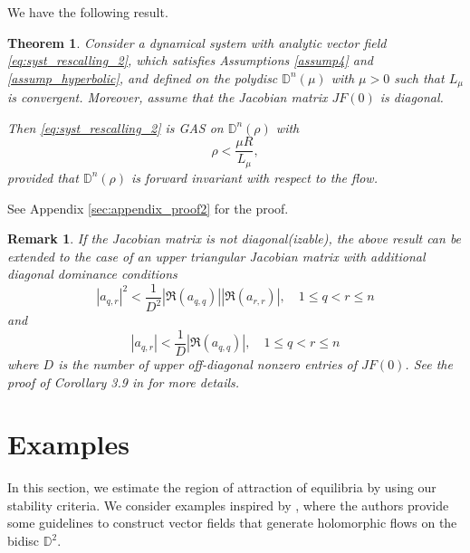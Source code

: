 \documentclass{article}
\newtheorem{theorem}{Theorem}
\newtheorem{remark}{Remark}
\begin{document}
We have the following result.

\begin{theorem}\label{thm:gen2}
Consider a dynamical system with analytic vector field \eqref{eq:syst_rescalling_2}, which satisfies Assumptions \ref{assump4} and \ref{assump_hyperbolic}, and defined on the polydisc $\mathbb{D}^n(\mu)$ with $\mu>0$ such that $L_\mu$ is convergent. Moreover, assume that the Jacobian matrix $JF(0)$ is diagonal.

Then \eqref{eq:syst_rescalling_2} is GAS on $\mathbb{D}^n(\rho)$ with
\begin{equation}
\label{eq:criteria_thm2}
 \rho<\frac{\mu R}{L_\mu},
\end{equation}
provided that $\mathbb{D}^n\left(\rho\right)$ is forward invariant with respect to the flow.
\end{theorem}

See Appendix \ref{sec:appendix_proof2} for the proof.

\begin{remark}
If the Jacobian matrix is not diagonal(izable), the above result can be extended to the case of an upper triangular Jacobian matrix with additional diagonal dominance conditions
\begin{equation*}
\label{eq:diagonal_dominant}
   \left|a_{q,r}\right|^2 < \frac{1}{D^2} \left|\Re(a_{q,q})\right| \left| \Re(a_{r,r}) \right|, \quad 1 \leq q < r \leq n
\end{equation*}
and
\begin{equation*}
\label{eq:diagonal_dominant2}
    \left|a_{q,r}\right| < \frac{1}{D} \left|\Re(a_{q,q})\right|, \quad 1 \leq q < r \leq n
\end{equation*}
where $D$ is the number of upper off-diagonal nonzero entries of $JF(0)$.
    See the proof of Corollary 3.9 in \cite{CMZAM2} for more details.
\end{remark}


\section{Examples}
\label{sec:illustra}

In this section, we estimate the region of attraction of equilibria by using our stability criteria. We consider examples inspired by \cite{MCCDFSD}, where the authors provide some guidelines to construct vector fields that generate holomorphic flows on the bidisc $\mathbb{D}^2$.
 
\end{document}
